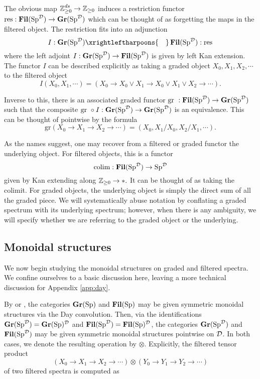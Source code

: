 The obvious map $\Z_{\geq 0}^{ds} \to \Z_{\geq 0}$ induces a restriction functor $\text{res}: \Fil(\Sp^{\D}) \to \Gr(\Sp^{\D})$ which can be thought of as forgetting the maps in the filtered object.  The restriction fits into an adjunction  
$$I:\Gr(\Sp^{\D}) \xrightleftharpoons{\quad} \Fil(\Sp^{\D}) : \text{res}$$
where the left adjoint $I: \Gr(\Sp^{\D}) \to \Fil(\Sp^{\D})$ is given by left Kan extension.  The functor $I$ can be described explicitly as taking a graded object $X_0,X_1,X_2,\cdots$ to the filtered object $$I(X_0, X_1, \cdots) = (X_0\to X_0 \vee X_1\to X_0 \vee X_1 \vee X_2\to \cdots).$$   

Inverse to this, there is an associated graded functor $\text{gr }: \Fil(\Sp^{\D}) \to \Gr(\Sp^{\D})$ such that the composite $\text{gr }\circ I : \Gr(\Sp^{\D}) \to \Gr(\Sp^{\D})$ is an equivalence.   This can be thought of pointwise by the formula $$\text{gr}(X_0\to X_1\to X_2\to \cdots) = (X_0, X_1/X_0, X_2/X_1, \cdots).$$

As the names suggest, one may recover from a filtered or graded functor the underlying object.  For filtered objects, this is a functor $$\colim : \Fil(\Sp^{\D}) \to \Sp^{\D}$$ given by Kan extending along $\Z_{\geq 0}\to *.$   It can be thought of as taking the colimit.  For graded objects, the underlying object is simply the direct sum of all the graded piece. We will systematically abuse notation by conflating a graded spectrum with its underlying spectrum; however, when there is any ambiguity, we will specify whether we are referring to the graded object or the underlying.




\subsection{Monoidal structures}\label{sect:monoidal}
We now begin studying the monoidal structures on graded and filtered spectra.  We confine ourselves to a basic discussion here, leaving a more technical discussion for Appendix \ref{app:day}.

By \cite{Glasman} or \cite[Example 2.2.6.17]{HA}, the categories $\Gr(\Sp)$ and $\Fil(\Sp)$ may be given symmetric monoidal structures via the Day convolution.  Then, via the identifications $\Gr(\Sp^{\D}) = \Gr(\Sp)^{\D}$ and $\Fil(\Sp^{\D}) = \Fil(\Sp)^{\D}$, the categories $\Gr(\Sp^{\D})$ and $\Fil(\Sp^{\D})$ may be given symmetric monoidal structures pointwise on $\D$.  In both cases, we denote the resulting operation by $\otimes$. Explicitly, the filtered tensor product $$\left(X_0 \longrightarrow X_1 \longrightarrow X_2 \longrightarrow \cdots \right) \otimes \left(Y_0 \longrightarrow Y_1 \longrightarrow Y_2 \longrightarrow \cdots \right)$$
of two filtered spectra is computed as

